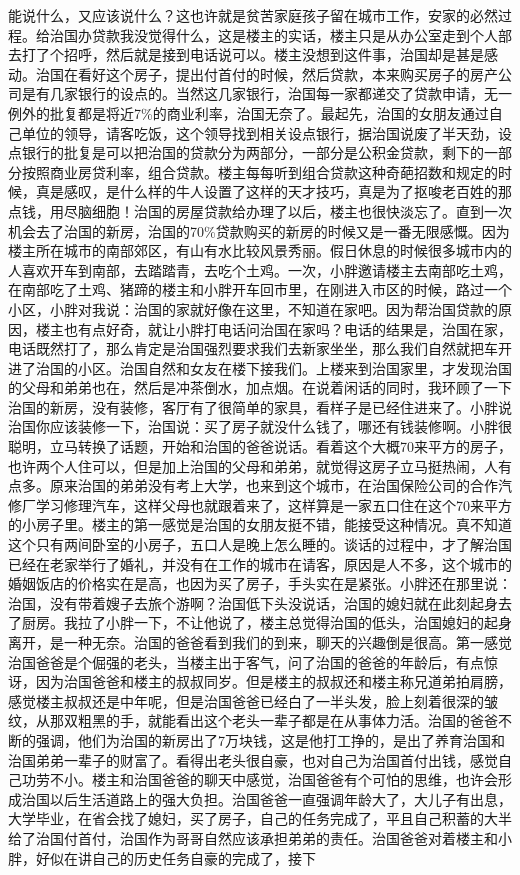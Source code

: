 能说什么，又应该说什么？这也许就是贫苦家庭孩子留在城市工作，安家的必然过程。给治国办贷款我没觉得什么，这是楼主的实话，楼主只是从办公室走到个人部去打了个招呼，然后就是接到电话说可以。楼主没想到这件事，治国却是甚是感动。治国在看好这个房子，提出付首付的时候，然后贷款，本来购买房子的房产公司是有几家银行的设点的。当然这几家银行，治国每一家都递交了贷款申请，无一例外的批复都是将近7\%的商业利率，治国无奈了。最起先，治国的女朋友通过自己单位的领导，请客吃饭，这个领导找到相关设点银行，据治国说废了半天劲，设点银行的批复是可以把治国的贷款分为两部分，一部分是公积金贷款，剩下的一部分按照商业房贷利率，组合贷款。楼主每每听到组合贷款这种奇葩招数和规定的时候，真是感叹，是什么样的牛人设置了这样的天才技巧，真是为了抠唆老百姓的那点钱，用尽脑细胞！治国的房屋贷款给办理了以后，楼主也很快淡忘了。直到一次机会去了治国的新房，治国的70\%贷款购买的新房的时候又是一番无限感慨。因为楼主所在城市的南部郊区，有山有水比较风景秀丽。假日休息的时候很多城市内的人喜欢开车到南部，去踏踏青，去吃个土鸡。一次，小胖邀请楼主去南部吃土鸡，在南部吃了土鸡、猪蹄的楼主和小胖开车回市里，在刚进入市区的时候，路过一个小区，小胖对我说：治国的家就好像在这里，不知道在家吧。因为帮治国贷款的原因，楼主也有点好奇，就让小胖打电话问治国在家吗？电话的结果是，治国在家，电话既然打了，那么肯定是治国强烈要求我们去新家坐坐，那么我们自然就把车开进了治国的小区。治国自然和女友在楼下接我们。上楼来到治国家里，才发现治国的父母和弟弟也在，然后是冲茶倒水，加点烟。在说着闲话的同时，我环顾了一下治国的新房，没有装修，客厅有了很简单的家具，看样子是已经住进来了。小胖说治国你应该装修一下，治国说：买了房子就没什么钱了，哪还有钱装修啊。小胖很聪明，立马转换了话题，开始和治国的爸爸说话。看着这个大概70来平方的房子，也许两个人住可以，但是加上治国的父母和弟弟，就觉得这房子立马挺热闹，人有点多。原来治国的弟弟没有考上大学，也来到这个城市，在治国保险公司的合作汽修厂学习修理汽车，这样父母也就跟着来了，这样算是一家五口住在这个70来平方的小房子里。楼主的第一感觉是治国的女朋友挺不错，能接受这种情况。真不知道这个只有两间卧室的小房子，五口人是晚上怎么睡的。谈话的过程中，才了解治国已经在老家举行了婚礼，并没有在工作的城市在请客，原因是人不多，这个城市的婚姻饭店的价格实在是高，也因为买了房子，手头实在是紧张。小胖还在那里说：治国，没有带着嫂子去旅个游啊？治国低下头没说话，治国的媳妇就在此刻起身去了厨房。我拉了小胖一下，不让他说了，楼主总觉得治国的低头，治国媳妇的起身离开，是一种无奈。治国的爸爸看到我们的到来，聊天的兴趣倒是很高。第一感觉治国爸爸是个倔强的老头，当楼主出于客气，问了治国的爸爸的年龄后，有点惊讶，因为治国爸爸和楼主的叔叔同岁。但是楼主的叔叔还和楼主称兄道弟拍肩膀，感觉楼主叔叔还是中年呢，但是治国爸爸已经白了一半头发，脸上刻着很深的皱纹，从那双粗黑的手，就能看出这个老头一辈子都是在从事体力活。治国的爸爸不断的强调，他们为治国的新房出了7万块钱，这是他打工挣的，是出了养育治国和治国弟弟一辈子的财富了。看得出老头很自豪，也对自己为治国首付出钱，感觉自己功劳不小。楼主和治国爸爸的聊天中感觉，治国爸爸有个可怕的思维，也许会形成治国以后生活道路上的强大负担。治国爸爸一直强调年龄大了，大儿子有出息，大学毕业，在省会找了媳妇，买了房子，自己的任务完成了，平且自己积蓄的大半给了治国付首付，治国作为哥哥自然应该承担弟弟的责任。治国爸爸对着楼主和小胖，好似在讲自己的历史任务自豪的完成了，接下